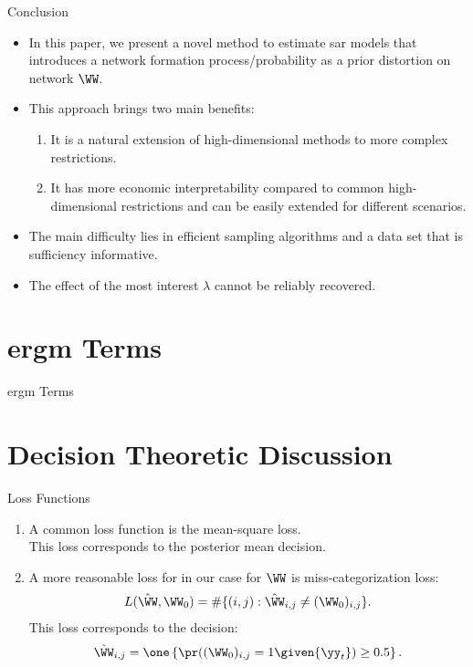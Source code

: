 \documentclass{beamer}
\begin{document}
\begin{frame}{Conclusion}
	\begin{itemize}
		\item
			In this paper,
			we present a novel method to estimate \acrshort{sar} models
			that introduces a network formation process/probability as a prior distortion on network $\WW$.
		\item
			This approach brings two main benefits:
			\begin{enumerate}
				\item
					It is a natural extension of high-dimensional methods
					to more complex restrictions.
				\item
					It has more economic interpretability compared to common high-dimensional restrictions
					and can be easily extended for different scenarios.
			\end{enumerate}
		\item
			The main difficulty lies in efficient sampling algorithms
			and a data set that is sufficiency informative.
		\item
			The effect of the most interest $\lambda$ cannot be reliably recovered.
	\end{itemize}
\end{frame}

\appendix

\section{\acrshort{ergm} Terms}

\begin{frame}{\acrshort{ergm} Terms}
	
\end{frame}

\section{Decision Theoretic Discussion}

\begin{frame}{Loss Functions}
	\begin{enumerate}
		\item
			A common loss function is the mean-square loss.\\
			This loss corresponds to the posterior mean decision.
		\item
			A more reasonable loss for in our case for $\WW$ is miss-categorization loss:
			\begin{align*}
				L(\hat\WW,\WW_0) = \#\{(i,j):\hat\WW_{i,j}\neq(\WW_{0})_{i,j}\}.
			\end{align*}
			This loss corresponds to the decision:
			\begin{align*}
				\hat\WW_{i,j} = \one
				\left\{
				\pr((\WW_0)_{i,j}=1\given\{\yy_{t}\}) \geq 0.5
				\right\}.
			\end{align*}
	\end{enumerate}
\end{frame}
\end{document}
